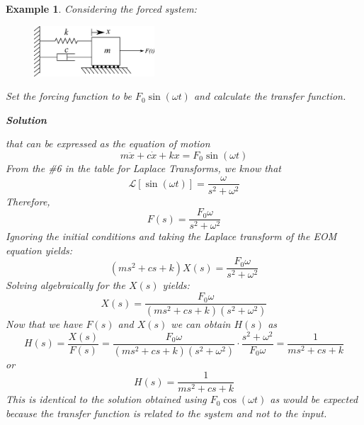 \documentclass[12pt,letter]{article}
\newtheorem{ex}{Example}
\numberwithin{ex}{section} %
\newenvironment{example}{\begin{mdframed}[middlelinewidth=0.5mm]\begin{ex}\normalfont}{\end{ex}\end{mdframed}}
\newcommand{\Laplace}[1]{\ensuremath{\mathcal{L}{\left[#1\right]}}}
\begin{document}
\begin{example}

Considering the forced system:
\begin{figure}[H]
	\centering
	\includegraphics[width=0.4\textwidth]{../Figures/forced_spring_mass_damper_system.png}
\end{figure}
Set the forcing function to be $F_0 \sin(\omega t)$ and calculate the transfer function. 

\textbf{Solution}

that can be expressed as the equation of motion
\begin{equation}
	m\ddot{x} + c\dot{x} +kx = F_0 \sin(\omega t)
\end{equation}
From the \#6 in the table for Laplace Transforms, we know that
\begin{equation}
	\Laplace{\sin(\omega t)} = \frac{\omega}{s^2+\omega^2}
\end{equation}
Therefore, 
\begin{equation}
F(s) = \frac{F_0\omega}{s^2+\omega^2}
\end{equation}
Ignoring the initial conditions and taking the Laplace transform of the EOM equation yields:
\begin{equation}
(ms^2 + cs +k)X(s) = \frac{F_0 \omega}{s^2+\omega^2} 
\end{equation}
Solving algebraically for the $X(s)$ yields: 
\begin{equation}
X(s) = \frac{F_0\omega}{(ms^2 + cs +k)(s^2+\omega^2)}
\end{equation}
Now that we have $F(s)$ and $X(s)$ we can obtain $H(s)$ as  
\begin{equation}
H(s) = \frac{X(s)}{F(s)} = \frac{F_0 \omega }{(ms^2 + cs +k)(s^2+\omega^2)} \cdot \frac{s^2+\omega^2}{F_0 \omega} = \frac{1}{ms^2+cs+k}
\end{equation}
or 
\begin{equation}
H(s) = \frac{1}{ms^2+cs+k}
\end{equation}
This is identical to the solution obtained using $F_0 \cos(\omega t)$ as would be expected because the transfer function is related to the system and not to the input. 
\end{example}  
\end{document}
